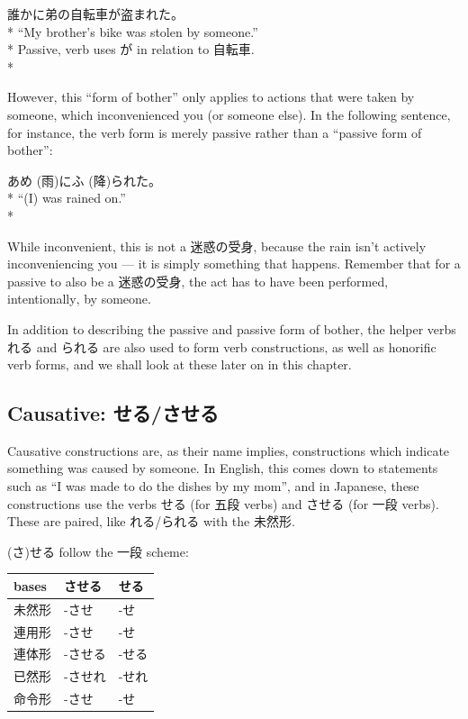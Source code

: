\documentclass[11pt, b5paper, twoside, openright, onecolumn]{book}
\makeatletter
\newcommand*{\rubystack}[2]{{\relscale{0.5}%
  \begin{tabular}[b]{@{}c@{}}%
    {#1}\\%
   {\textscale{2}{#2}}%
  \end{tabular}}%
}
\DeclareRobustCommand*{\ruby}[2]{%
  \mbox{%
    \setlength{\parskip}{0ex}%
    \BeginAccSupp{method=pdfstringdef,ActualText={#1}}%
      \rubystack{\phantom{#2}}{#1}%
      \llap{%
        \rubystack{#2}{\phantom{#1}}%
      }%
    \EndAccSupp{}%
  }%
}
\renewcommand*{\ruby}[2]{#2 (#1)}%
\newenvironment{exampleblock}{
\setlength{\parindent}{0.6in}
\begin{minipage}[t]{\dimexpr\textwidth-\parindent}}
{\end{minipage}}
\newenvironment{mytabular}[1]{\noindent\hspace{0.4in}
\begin{tabular}[h]{#1}}{\end{tabular}}
\makeatother
\begin{document}
\begin{exampleblock}
誰かに弟の自転車が盗まれた。 \\* 
“My brother’s bike was stolen by someone.” \\* 
Passive‚ verb uses が in relation to 自転車. \\* 
\end{exampleblock}
\vspace{0.2cm}

However‚ this “form of bother” only applies to actions that were taken by someone‚ which inconvenienced you (or someone else). In the following sentence‚ for instance‚ the verb form is merely passive rather than a “passive form of bother”:

\vspace{0.4cm}
\begin{exampleblock}
\ruby{雨}{あめ}に\ruby{降}{ふ}られた。 \\* 
“(I) was rained on.” \\* 
\end{exampleblock}
\vspace{0.2cm}

While inconvenient‚ this is not a 迷惑の受身‚ because the rain isn’t actively inconveniencing you — it is simply something that happens. Remember that for a passive to also be a 迷惑の受身‚ the act has to have been performed‚ intentionally‚ by someone.

In addition to describing the passive and passive form of bother‚ the helper verbs れる and られる are also used to form  verb constructions‚ as well as honorific verb forms‚ and we shall look at these later on in this chapter.
\subsection{Causative: せる/させる}

Causative constructions are‚ as their name implies‚ constructions which indicate something was caused by someone. In English‚ this comes down to statements such as “I was made to do the dishes by my mom”‚ and in Japanese‚ these constructions use the verbs せる (for 五段 verbs) and させる (for 一段 verbs). These are paired‚ like れる/られる with the 未然形.

(さ)せる follow the 一段 scheme:

\vspace{0.5cm}
\smaller
\begin{mytabular}{| l  l  l |}\hline 
\rule{0pt}{2.4ex}bases & させる & せる\\ 
\hline
\rule{0pt}{2.4ex}未然形 & -させ & -せ\\ 
\rule{0pt}{2.4ex}連用形 & -させ & -せ\\ 
\rule{0pt}{2.4ex}連体形 & -させる & -せる\\ 
\rule{0pt}{2.4ex}已然形 & -させれ & -せれ\\ 
\rule{0pt}{2.4ex}命令形 & -させ & -せ\\ 
\hline 
\end{mytabular}
\larger
\vspace{0.5cm}
\end{document}
